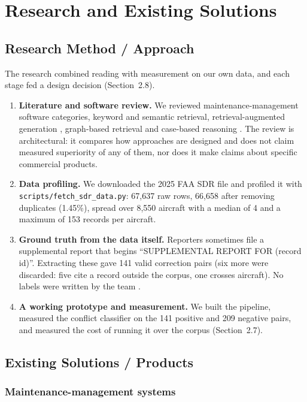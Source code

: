 \chapter{Research and Existing Solutions}

\section{Research Method / Approach}

The research combined reading with measurement on our own data, and each stage fed a design decision (Section~2.8).

\begin{enumerate}
\item \textbf{Literature and software review.} We reviewed maintenance-management software categories, keyword and semantic retrieval, retrieval-augmented generation \citep{asai2023,lewis2020}, graph-based retrieval \citep{edge2024} and case-based reasoning \citep{aamodt1994}. The review is architectural: it compares how approaches are designed and does not claim measured superiority of any of them, nor does it make claims about specific commercial products.
\item \textbf{Data profiling.} We downloaded the 2025 FAA SDR file and profiled it with \texttt{scripts/fetch\_sdr\_data.py}: 67{,}637 raw rows, 66{,}658 after removing duplicates (1.45\%), spread over 8{,}550 aircraft with a median of 4 and a maximum of 153 records per aircraft.
\item \textbf{Ground truth from the data itself.} Reporters sometimes file a supplemental report that begins ``SUPPLEMENTAL REPORT FOR (record id)''. Extracting these gave 141 valid correction pairs (six more were discarded: five cite a record outside the corpus, one crosses aircraft). No labels were written by the team \citep{faa2025}.
\item \textbf{A working prototype and measurement.} We built the pipeline, measured the conflict classifier on the 141 positive and 209 negative pairs, and measured the cost of running it over the corpus (Section~2.7).
\end{enumerate}

\section{Existing Solutions / Products}

\subsection{Maintenance-management systems}


